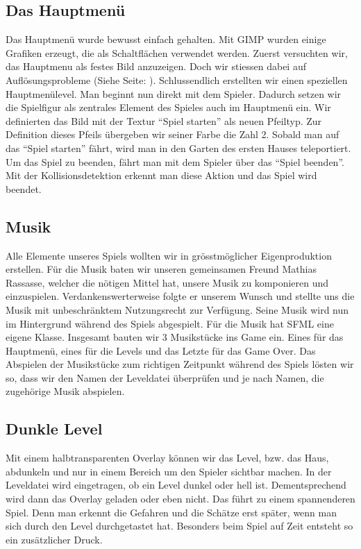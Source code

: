 \documentclass[11pt,a4paper]{scrbook}
\newcommand{\q}[1]{``#1''}
\begin{document}
\subsection{Das Hauptmenü}     
Das Hauptmenü wurde bewusst einfach gehalten. Mit GIMP wurden     
einige Grafiken erzeugt, die als Schaltflächen verwendet werden.
Zuerst versuchten wir, das Hauptmenu als festes Bild anzuzeigen. Doch wir stiessen dabei auf Auflösungsprobleme (Siehe Seite: \pageref{aufloesungsprobleme}).
Schlussendlich erstellten wir einen speziellen Hauptmenülevel.
Man beginnt nun direkt mit dem Spieler.
Dadurch setzen wir die Spielfigur als zentrales Element des Spieles auch im Hauptmenü ein.
Wir definierten das Bild mit der Textur \q{Spiel starten} als neuen Pfeiltyp. 
Zur Definition dieses Pfeils übergeben wir seiner Farbe die Zahl 2. 
Sobald man auf das \q{Spiel starten} fährt, wird man in den Garten des ersten Hauses teleportiert. 
Um das Spiel zu beenden, fährt man mit dem Spieler über das \q{Spiel beenden}. Mit der Kollisionsdetektion erkennt man diese Aktion und das Spiel wird beendet.

\subsection{Musik}     
Alle Elemente unseres Spiels wollten wir in grösstmöglicher Eigenproduktion erstellen. Für die Musik baten wir unseren gemeinsamen Freund Mathias Rassasse, welcher die nötigen Mittel hat, unsere Musik zu komponieren und einzuspielen. Verdankenswerterweise folgte er unserem Wunsch und stellte uns die Musik mit unbeschränktem Nutzungsrecht zur Verfügung. 
Seine Musik wird nun im Hintergrund während des Spiels abgespielt. 
Für die Musik hat SFML eine eigene Klasse. 
Insgesamt bauten wir 3 Musikstücke ins Game ein. 
Eines für das Hauptmenü, eines für die Levels und das Letzte für das Game Over. 
Das Abspielen der Musikstücke zum richtigen Zeitpunkt während des Spiels lösten wir so, dass wir den Namen der Leveldatei überprüfen und je nach Namen, die zugehörige Musik abspielen.
    
    
\subsection{Dunkle Level}     
Mit einem halbtransparenten Overlay können wir das Level, bzw. das Haus, abdunkeln und nur in einem Bereich um den Spieler sichtbar machen.
In der Leveldatei wird eingetragen, ob ein Level dunkel oder hell ist. Dementsprechend wird dann das Overlay geladen oder eben nicht. Das führt zu einem spannenderen Spiel. Denn man erkennt die Gefahren und die Schätze erst später, wenn man sich durch den Level durchgetastet hat.
Besonders beim Spiel auf Zeit entsteht so ein zusätzlicher Druck. 
\end{document}
